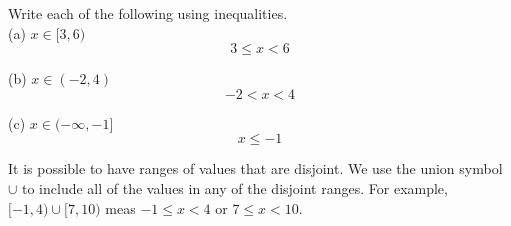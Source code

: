 \begin{exercise}\nonumber
	Write each of the following using inequalities. \\

	(a) $ x \in [3, 6) $ \\
	$$
		3 \le x < 6
	$$

	(b) $ x \in (-2, 4) $ \\
	$$
		-2 < x < 4
	$$

	(c) $ x \in (-\infty, -1] $ \\
	$$
		x \le -1
	$$
\end{exercise}

It is possible to have ranges of values that are disjoint. We use the union symbol $ \cup $ to include all of the values in any of the disjoint ranges. For example, $ [-1, 4) \cup [7, 10) $ meas $ -1 \le x < 4 $ or $ 7 \le x < 10 $. \\

\newpage